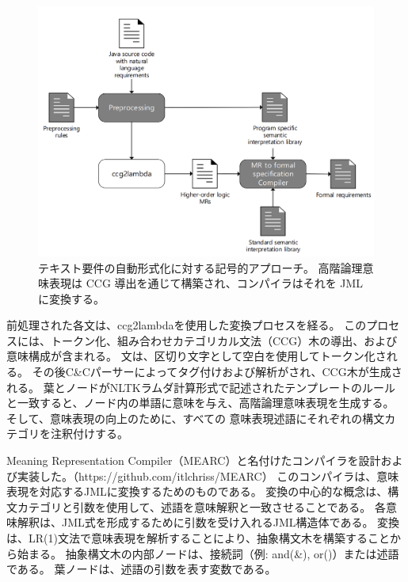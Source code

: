 \documentclass[uplatex, twocolumn, 10pt]{jsarticle} %
\begin{document}
\begin{figure}[t]
    \begin{center}
        \includegraphics[width=\linewidth]{../image/TNLR/Fig1_Symb_app.png}
        \caption{テキスト要件の自動形式化に対する記号的アプローチ。
            高階論理意味表現は CCG 導出を通じて構築され、コンパイラはそれを JML に変換する。}
        \label{fig:Symb_app}
    \end{center}
\end{figure}

前処理された各文は、ccg2lambda\cite{3}を使用した変換プロセスを経る。
このプロセスには、トークン化、組み合わせカテゴリカル文法（CCG）木の導出、および意味構成が含まれる。
文は、区切り文字として空白を使用してトークン化される。
その後C\&Cパーサーによってタグ付けおよび解析がされ、CCG木が生成される。
葉とノードがNLTK\cite{7}ラムダ計算形式で記述されたテンプレートのルールと一致すると、ノード内の単語に意味を与え、高階論理意味表現を生成する。
そして、意味表現の向上のために、すべての 意味表現述語にそれぞれの構文カテゴリを注釈付けする。

Meaning Representation Compiler（MEARC）と名付けたコンパイラを設計および実装した。（https://github.com/itlchriss/MEARC）
このコンパイラは、意味表現を対応するJMLに変換するためのものである。
変換の中心的な概念は、構文カテゴリと引数を使用して、述語を意味解釈と一致させることである。
各意味解釈は、JML式を形成するために引数を受け入れるJML構造体である。
変換は、LR(1)文法で意味表現を解析することにより、抽象構文木を構築することから始まる。
抽象構文木の内部ノードは、接続詞（例: and(\&), or(\textbar)）または述語である。
葉ノードは、述語の引数を表す変数である。
\end{document}
